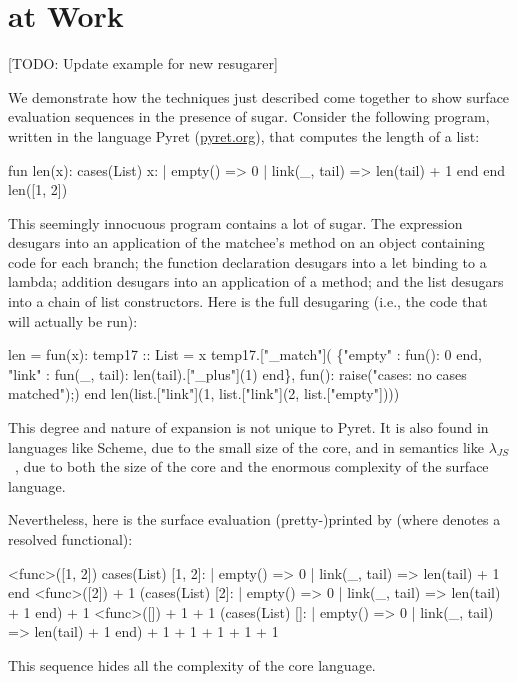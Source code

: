 \section{{\Resugarer} at Work}
\label{sec:reval-pyret-example}

[TODO: Update example for new resugarer]

We demonstrate how the techniques just described come together to show
surface evaluation sequences in the presence of sugar. Consider the
following program, written in the language Pyret (\url{pyret.org}), 
that computes the length of a list:
\begin{Codes}
    fun len(x):
      cases(List) x:
        | empty() => 0
        | link(_, tail) => len(tail) + 1
      end
    end
    len([1, 2])
\end{Codes}
This seemingly innocuous program contains a lot of sugar. The 
expression desugars into an application of the matchee's 
method on an object containing code for each branch; the function
declaration desugars into a let binding to a lambda; addition desugars
into an application of a  method; and the list \Code{[1, 2]}
desugars into a chain of list constructors. Here is the full desugaring
(i.e., the code that will actually be run):
\begin{Codes}
len = fun(x):
    temp17 :: List = x
    temp17.["_match"](
      \{"empty" : fun(): 0 end,
       "link" : fun(_, tail):
                len(tail).["_plus"](1) end\},
      fun(): raise("cases: no cases matched");)
    end
len(list.["link"](1, list.["link"](2, list.["empty"])))
\end{Codes}
This degree and nature of expansion is not unique to Pyret.
It is also found in languages like Scheme, due
to the small size of the core, and in semantics like
$\lambda_{JS}$~\cite{lambda-js},
due to both the size of the core and the enormous complexity
of the surface language.

Nevertheless, here is the surface evaluation (pretty-)printed by {\Resugarer} (where
 denotes a resolved functional):
\begin{Codes}
\SurfStep <func>([1, 2])
\SurfStep cases(List) [1, 2]:
      | empty() => 0
      | link(_, tail) => len(tail) + 1
    end
\SurfStep <func>([2]) + 1
\SurfStep (cases(List) [2]:
      | empty() => 0
      | link(_, tail) => len(tail) + 1
    end) + 1
\SurfStep <func>([]) + 1 + 1
\SurfStep (cases(List) []:
      | empty() => 0
      | link(_, tail) => len(tail) + 1
    end) + 1 + 1
 + 1 + 1
 + 1
\end{Codes}
This sequence hides all the complexity of the core language.


